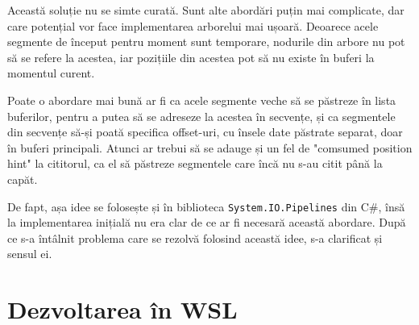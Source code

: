 \documentclass[a4paper,12pt]{report}
\begin{document}
Această soluție nu se simte curată.
Sunt alte abordări puțin mai complicate, dar care potențial vor face implementarea arborelui mai ușoară.
Deoarece acele segmente de început pentru moment sunt temporare,
nodurile din arbore nu pot să se refere la acestea, iar pozițiile din acestea pot să nu existe în buferi la momentul curent.

Poate o abordare mai bună ar fi ca acele segmente veche să se păstreze în lista buferilor,
pentru a putea să se adreseze la acestea în secvențe,
și ca segmentele din secvențe să-și poată specifica offset-uri,
cu însele date păstrate separat, doar în buferi principali.
Atunci ar trebui să se adauge și un fel de "comsumed position hint" la cititorul,
ca el să păstreze segmentele care încă nu s-au citit până la capăt.

De fapt, așa idee se folosește și în biblioteca \texttt{System.IO.Pipelines} din C\#,
însă la implementarea inițială nu era clar de ce ar fi necesară această abordare.
După ce s-a întâlnit problema care se rezolvă folosind această idee, s-a clarificat și sensul ei.



\chapter{Dezvoltarea în WSL}






\newpage
{}





\appendix

\renewcommand{\thechapter}{\arabic{chapter}}


\setcounter{chapter}{1}

\end{document}
